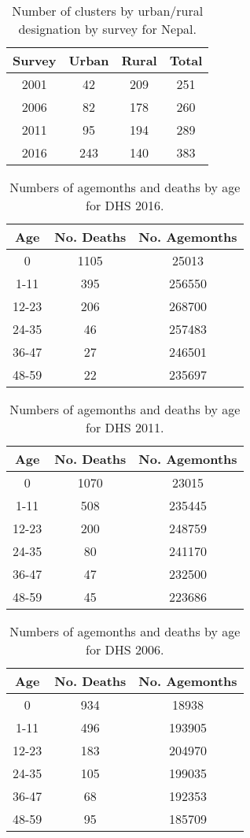 \documentclass[]{article}
\begin{document}
\begin{table}[ht]
\centering
\begin{tabular}{cccc}
  \hline
Survey & Urban & Rural & Total \\ 
  \hline
2001 & 42 & 209 & 251 \\ 
  2006 & 82 & 178 & 260 \\ 
  2011 & 95 & 194 & 289 \\ 
  2016 & 243 & 140 & 383 \\ 
   \hline
\end{tabular}
\caption{Number of clusters by urban/rural designation by survey for Nepal.} 
\end{table}
\begin{table}[!ht]
\centering
\begin{tabular}{ccc}
  \hline
Age & No. Deaths & No. Agemonths \\ 
  \hline
0 & 1105 & 25013 \\ 
  1-11 & 395 & 256550 \\ 
  12-23 & 206 & 268700 \\ 
  24-35 & 46 & 257483 \\ 
  36-47 & 27 & 246501 \\ 
  48-59 & 22 & 235697 \\ 
   \hline
\end{tabular}
\caption{Numbers of agemonths and deaths by age for DHS 2016.} 
\end{table}
\begin{table}[!ht]
\centering
\begin{tabular}{ccc}
  \hline
Age & No. Deaths & No. Agemonths \\ 
  \hline
0 & 1070 & 23015 \\ 
  1-11 & 508 & 235445 \\ 
  12-23 & 200 & 248759 \\ 
  24-35 & 80 & 241170 \\ 
  36-47 & 47 & 232500 \\ 
  48-59 & 45 & 223686 \\ 
   \hline
\end{tabular}
\caption{Numbers of agemonths and deaths by age for DHS 2011.} 
\end{table}
\begin{table}[!ht]
\centering
\begin{tabular}{ccc}
  \hline
Age & No. Deaths & No. Agemonths \\ 
  \hline
0 & 934 & 18938 \\ 
  1-11 & 496 & 193905 \\ 
  12-23 & 183 & 204970 \\ 
  24-35 & 105 & 199035 \\ 
  36-47 & 68 & 192353 \\ 
  48-59 & 95 & 185709 \\ 
   \hline
\end{tabular}
\caption{Numbers of agemonths and deaths by age for DHS 2006.} 
\end{table}
\end{document}
